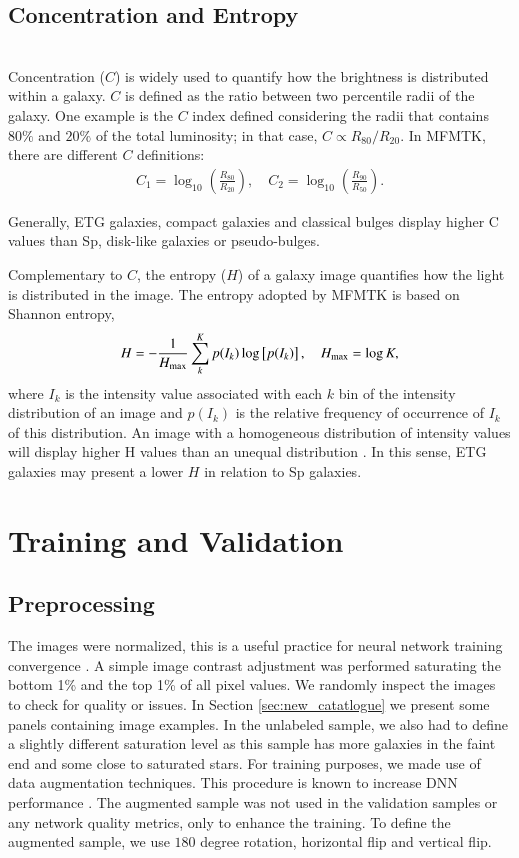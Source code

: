 \documentclass[fleqn,usenatbib]{mnras}
\begin{document}
\subsection{Concentration and Entropy} \ \\
Concentration ($C$) \citep{Kent_1985,Bershady_2000} is widely used to quantify how the brightness is distributed within a galaxy. $C$ is defined as the ratio between two percentile radii of the galaxy. One example is the $C$ index defined considering the radii that contains $80\%$ and $20\%$ of the total luminosity; in that case, $C \propto R_{80}/R_{20}$. In \textsc{MFMTK}, there are different $C$ definitions:
\begin{align}
    C_1= \log_{10} \left( \frac{R_{80}}{R_{20}}\right),\quad 
    C_2= \log_{10} \left( \frac{R_{90}}{R_{50}}\right).
\end{align}

\noindent Generally, ETG galaxies, compact galaxies and classical bulges display higher C values than Sp, disk-like galaxies or pseudo-bulges.

Complementary to $C$, the entropy ($H$) of a galaxy image \citep{Ferrari_2015} quantifies how the light is distributed in the image. The entropy adopted by \textsc{MFMTK} is based on Shannon entropy, 
\begin{align}
H = -\frac{1}{H_{\rm max}} \sum_k^K p(I_k) \log\left[ p(I_k)\right], \quad H_{\rm max} = \log K, 
\end{align} 
where $I_k$ is the intensity value associated with each $k$ bin of the intensity distribution of an image and $p(I_k)$ is the relative frequency of occurrence of $I_k$ of this distribution.
An image with a homogeneous distribution of intensity values will display higher H values than an unequal distribution \citep{Bishop_2007}. In this sense, ETG galaxies may present a lower $H$ in relation to Sp galaxies.



\section{Training and Validation}
\label{sec:training}
\subsection{Preprocessing}
The images were normalized, this is a useful practice for neural network training convergence \citep{Goodfellow-et-al-2016}. A simple image contrast adjustment was performed saturating the bottom 1\% and the top 1\% of all pixel values. We randomly inspect the images to check for quality or issues. In Section \ref{sec:new_catatlogue} we present some panels containing image examples. In the unlabeled sample, we also had to define a  slightly different saturation level as this sample has more galaxies in the faint end and some close to saturated stars.
For training purposes, we made use of data augmentation techniques. This procedure is known to increase DNN performance \citep[see, e.g.,][]{chollet2018deep}. The augmented sample was not used in the validation samples or any network quality metrics, only to enhance the training. To define the augmented sample, we use $180$ degree rotation, horizontal flip and vertical flip.
\end{document}
